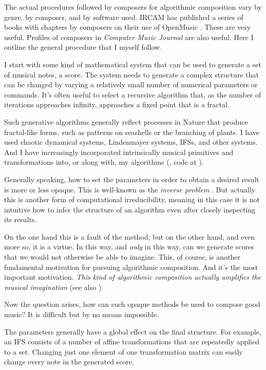 \documentclass[]{interact}
\theoremstyle{plain}%
\theoremstyle{definition}
\theoremstyle{remark}
\begin{document}
The actual procedures followed by composers for algorithmic composition vary by genre, by composer, and by software used. IRCAM has published a series of books with chapters by composers on their use of OpenMusic \citep{omcomposersbook, agon2006om, agon2008om, agon2016om}. These are very useful. Profiles of composers in \emph{Computer Music Journal} are also useful. Here I outline the general procedure that I myself follow.

I start with some kind of mathematical system that can be used to generate a set of musical notes, a score. The system needs to generate a complex structure that can be changed by varying a relatively small number of numerical parameters or commands. It’s often useful to select a recursive algorithm that, as the number of iterations approaches infinity, approaches a fixed point that is a fractal. 

Such generative algorithms generally reflect processes in Nature that produce fractal-like forms, such as patterns on seashells or the branching of plants. I have used chaotic dynamical systems, Lindenmayer systems, IFSs, and other systems. And I have increasingly incorporated intrinsically musical primitives and transformations into, or along with, my algorithms (\citet{Gogins2020}, code at \citet{GoginsPoustiniaCode2025}).

Generally speaking, how to set the parameters in order to obtain a desired result is more or less opaque. This is well-known as the \emph{inverse problem} \citep{graham2021applying, tu2023learning}. But actually this is another form of computational irreducibility, meaning in this case it is not intuitive how to infer the structure of an algorithm even after closely inspecting its results. 

On the one hand this is a fault of the method; but on the other hand, and even more so, it is a virtue. In this way, and \emph{only} in this way, can we generate scores that we would not otherwise be able to imagine. This, of course, is another fundamental motivation for pursuing algorithmic composition. And it's the most important motivation. \emph{This kind of algorithmic composition actually amplifies the musical imagination} (see also \citet{edwards2011algorithmic}).

Now the question arises, how can such opaque methods be used to compose good music? It is difficult but by no means impossible.

The parameters generally have a global effect on the final structure. For example, an IFS consists of a number of affine transformations that are repeatedly applied to a set. Changing just one element of one transformation matrix can easily change every note in the generated score.
\end{document}
